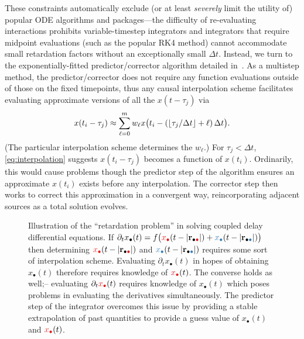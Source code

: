 These constraints automatically exclude (or at least \emph{severely} limit the utility of) popular ODE algorithms and packages---the difficulty of re-evaluating interactions prohibits variable-timestep integrators and integrators that require midpoint evaluations (such as the popular RK4 method) cannot accommodate small retardation factors without an exceptionally small $\Delta t$.
Instead, we turn to the exponentially-fitted predictor/corrector algorithm detailed in~\cite{Glaser2009}.
As a multistep method, the predictor/corrector does not require any function evaluations outside of those on the fixed timepoints, thus any causal interpolation scheme facilitates evaluating approximate versions of all the $x(t - \tau_j)$ via
\begin{equation}
  x(t_i - \tau_j) \approx \sum_{\ell = 0}^m w_\ell x\qty\big(t_i - (\lfloor\tau_j/\Delta t\rfloor + \ell)\, \Delta t).
  \label{eq:interpolation}
\end{equation}
(The particular interpolation scheme determines the $w_\ell$.)
For $\tau_j < \Delta t$, \cref{eq:interpolation} suggests $x(t_i - \tau_j)$ becomes a function of $x(t_i)$.
Ordinarily, this would cause problems though the predictor step of the algorithm ensures an approximate $x(t_i)$ exists before any interpolation.
The corrector step then works to correct this approximation in a convergent way, reincorporating adjacent sources as a total solution evolves.
  
\begin{figure}[]
  \centering
  \caption{\label{fig:retardation problem} Illustration of the ``retardation problem'' in solving coupled delay differential equations.
    If $\partial_t x_\bullet(t) = f\qty\big(\textcolor[RGB]{228,26,28}{x_\bullet}(t - \abs{\vb{r}_{\bullet \textcolor[RGB]{228,26,28}{\bullet}}}) + \textcolor[RGB]{55,126,184}{x_\bullet}(t - \abs{\vb{r}_{\bullet \textcolor[RGB]{55,126,184}{\bullet}}}))$ then determining $\textcolor[RGB]{228,26,28}{x_\bullet}(t - \abs{\vb{r}_{\bullet \textcolor[RGB]{228,26,28}{\bullet}}})$ and $\textcolor[RGB]{55,126,184}{x_\bullet}(t - \abs{\vb{r}_{\bullet \textcolor[RGB]{55,126,184}{\bullet}}})$ requires some sort of interpolation scheme.
    Evaluating $\partial_t x_\bullet(t)$ in hopes of obtaining $x_\bullet(t)$ therefore requires knowledge of $\textcolor[RGB]{228,26,28}{x_\bullet}(t)$.
    The converse holds as well;-- evaluating $\partial_t \textcolor[RGB]{228,26,28}{x_\bullet}(t)$ requires knowledge of $x_\bullet(t)$ which poses problems in evaluating the derivatives simultaneously.
    The predictor step of the integrator overcomes this issue by providing a stable extrapolation of past quantities to provide a guess value of $x_\bullet(t)$ and $\textcolor[RGB]{228,26,28}{x_\bullet}(t)$.
  }
\end{figure}

